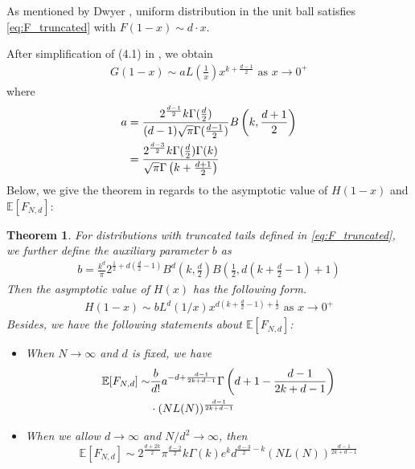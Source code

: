 \documentclass[conference,a4paper]{IEEEtran}
\def\E{\mathbb{E}}
\newtheorem{theorem}{Theorem}
\begin{document}
As mentioned by Dwyer \cite{dwyer1991convex}, uniform distribution
in the unit ball satisfies \eqref{eq:F_truncated} with
$F(1-x) \sim d\cdot x$.

After simplification of (4.1) in \cite{dwyer1991convex}, we obtain
\begin{align}
    G(1-x) \sim a
    L\left(\frac{1}{x} \right)
    x^{k+\frac{d-1}{2}} \textrm{ as } x \to 0^+ 
    \label{eq:truncated_G_1_x}
\end{align}
where
\begin{align}
a &=\frac{2^{\frac{d-1}{2}} k \Gamma(\frac{d}{2})}
    {(d-1) \sqrt{\pi} \Gamma(\frac{d-1}{2})}
    B\left(k, \frac{d+1}{2}\right) \notag \\
    &= \frac{2^{\frac{d-3}{2}} k \Gamma(\frac{d}{2})\Gamma(k)}
    {\sqrt{\pi} \Gamma\left(k+\frac{d+1}{2}\right)}
    \label{eq:a}
\end{align}
Below, we give the theorem in regards to the asymptotic value of $H(1-x)$ and $\E[F_{N,d}]$:
\begin{theorem}\label{thm:truncated_tails}
     For distributions with truncated tails
     defined in \eqref{eq:F_truncated}, we further define
     the auxiliary parameter $b$ as
     \begin{align}
          b =  \frac{k^d}{\pi}
          2^{\frac{1}{2} + d(\frac{d}{2}-1)} B^d\left(k, \frac{d}{2}\right)
          B\left( \frac{1}{2},
          d\left(k+\frac{d}{2} -1 \right)+1 \right)
          \label{eq:b}
      \end{align}
      Then the asymptotic value of $H(x)$ has the following form.
      \begin{align}
          H(1-x)  \sim b
          L^d(1/x) x^{d(k+\frac{d}{2}-1)+\frac{1}{2}} 
          \textrm{ as } x \to 0^+ \label{eq:truncated_H_1_x}
     \end{align}     
     Besides, we have
 the following statements about $\E[F_{N,d}]$:
\begin{itemize}
     \item When $N\to \infty$ and $d$ is fixed, we have
     \begin{align}\label{eq:efn_truncated_formula}
          \E[F_{N,d}] \sim &\frac{b}{d!}a^{-d+\frac{d-1}{2k+d-1}}
          \Gamma 
          \left(d+1-\frac{d-1}{2k+d-1}\right)
          \notag\\
          &\cdot (NL(N))^{\frac{d-1}{2k+d-1}}
      \end{align}
     \item  When we allow $d\to \infty$ and $N/d^2 \to \infty$, then
     \begin{equation}\label{eq:truncated_d_inf}
      \E[F_{N,d}] \sim 2^{\frac{d+2k}{2}}\pi^{\frac{d-2}{2}} k\Gamma(k)e^k d^{\frac{d-3}{2}-k}
      (NL(N))^{\frac{d-1}{2k+d-1}}
     \end{equation}    
\end{itemize}
\end{theorem}
\end{document}
